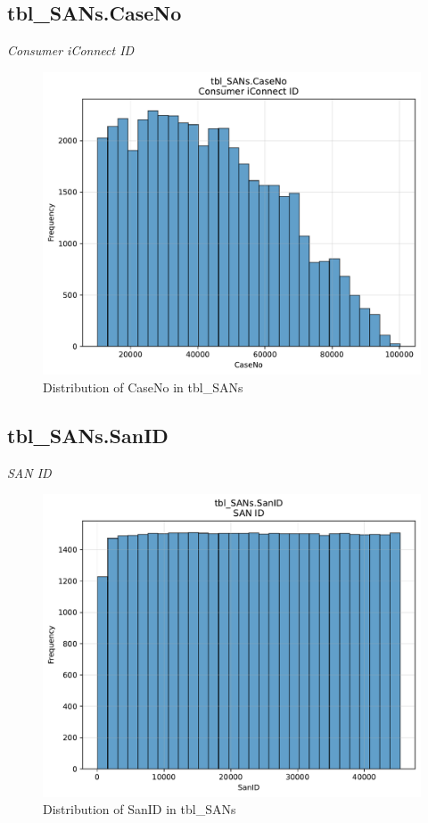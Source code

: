 \subsection{tbl\_SANs.CaseNo}
\textit{Consumer iConnect ID}

\begin{figure}[htbp]
\centering
\includegraphics[width=\textwidth]{figures/dbo_tbl_SANs_CaseNo.pdf}
\caption{Distribution of CaseNo in tbl\_SANs}
\end{figure}\newpage

\subsection{tbl\_SANs.SanID}
\textit{SAN ID}

\begin{figure}[htbp]
\centering
\includegraphics[width=\textwidth]{figures/dbo_tbl_SANs_SanID.pdf}
\caption{Distribution of SanID in tbl\_SANs}
\end{figure}\newpage

